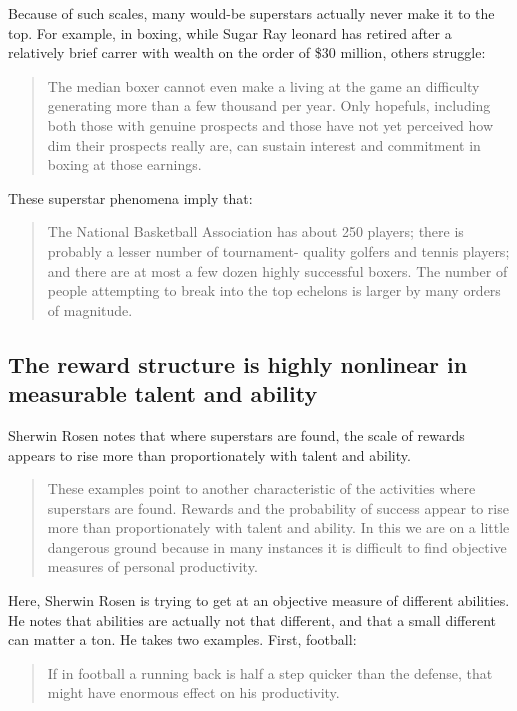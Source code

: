 \documentclass[]{book}
\theoremstyle{definition}
\theoremstyle{definition}
\theoremstyle{definition}
\theoremstyle{remark}
\begin{document}
Because of such scales, many would-be superstars actually never make it
to the top. For example, in boxing, while Sugar Ray leonard has retired
after a relatively brief carrer with wealth on the order of \$30
million, others struggle:

\begin{quote}
The median boxer cannot even make a living at the game an difficulty
generating more than a few thousand per year. Only hopefuls, including
both those with genuine prospects and those have not yet perceived how
dim their prospects really are, can sustain interest and commitment in
boxing at those earnings.
\end{quote}

These superstar phenomena imply that:

\begin{quote}
The National Basketball Association has about 250 players; there is
probably a lesser number of tournament- quality golfers and tennis
players; and there are at most a few dozen highly successful boxers. The
number of people attempting to break into the top echelons is larger by
many orders of magnitude.
\end{quote}

\subsection{The reward structure is highly nonlinear in measurable
talent and
ability}\label{the-reward-structure-is-highly-nonlinear-in-measurable-talent-and-ability}

Sherwin Rosen notes that where superstars are found, the scale of
rewards appears to rise more than proportionately with talent and
ability.

\begin{quote}
These examples point to another characteristic of the activities where
superstars are found. Rewards and the probability of success appear to
rise more than proportionately with talent and ability. In this we are
on a little dangerous ground because in many instances it is difficult
to find objective measures of personal productivity.
\end{quote}

Here, Sherwin Rosen is trying to get at an objective measure of
different abilities. He notes that abilities are actually not that
different, and that a small different can matter a ton. He takes two
examples. First, football:

\begin{quote}
If in football a running back is half a step quicker than the defense,
that might have enormous effect on his productivity.
\end{quote}
\end{document}
